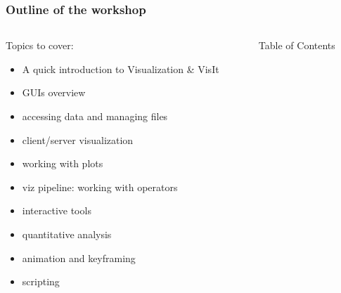 \documentclass[xcolor=svgnames]{beamer}
\begin{document}
\begin{frame}
\frametitle{Outline of the workshop}
\vspace{-5mm}
\begin{columns}[T]
\begin{column}{5.5cm}
  \begin{block}{Topics to cover:}
    \begin{itemize}\itemsep3pt
	\item A quick introduction to Visualization \& VisIt
	\item GUIs overview
	\item accessing data and managing files
	\item client/server visualization
	\item working with plots%
	\item viz pipeline: working with operators%
	\item interactive tools%
	\item quantitative analysis
	\item animation and keyframing
	\item scripting 
    \end{itemize}
  \end{block}
\end{column}
\begin{column}{5.5cm}
  \begin{beamerboxesrounded}{Table of Contents}
	\tableofcontents[hideallsubsections]%
  \end{beamerboxesrounded}
\end{column}
\end{columns}
\end{frame}
\end{document}
